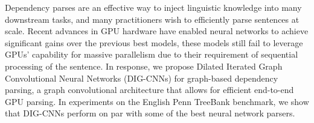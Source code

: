 Dependency parses are an effective way to inject linguistic knowledge into many downstream tasks, and many practitioners wish to efficiently parse sentences at scale. Recent advances in GPU hardware have enabled neural networks to achieve significant gains over the previous best models, these models still fail to leverage GPUs' capability for massive parallelism due to their requirement of sequential processing of the sentence. In response, we propose Dilated Iterated Graph Convolutional Neural Networks (DIG-CNNs) for graph-based dependency parsing, a graph convolutional architecture that allows for efficient end-to-end GPU parsing. In experiments on the English Penn TreeBank benchmark, we show that DIG-CNNs perform on par with some of the best neural network parsers.
